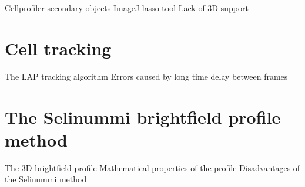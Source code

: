 Cellprofiler secondary objects
ImageJ lasso tool
Lack of 3D support

\section{Cell tracking}

The LAP tracking algorithm
Errors caused by long time delay between frames

\section{The Selinummi brightfield profile method}

The 3D brightfield profile
Mathematical properties of the profile
Disadvantages of the Selinummi method
